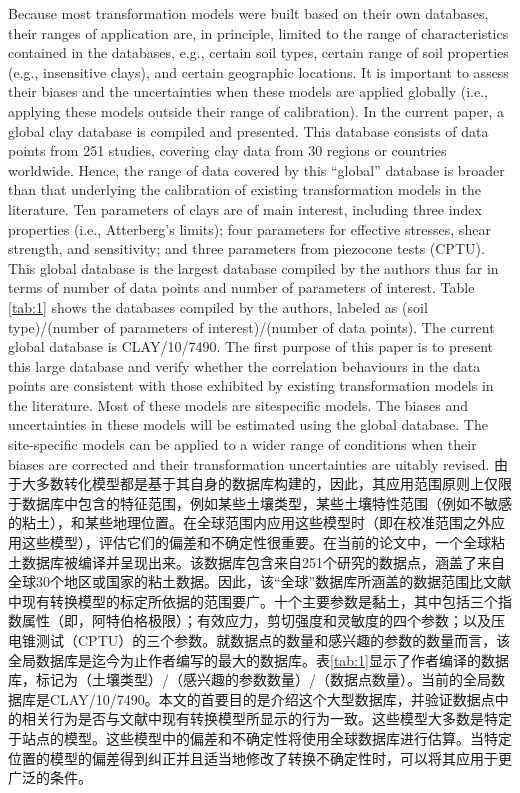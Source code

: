 \begin{Parallel}{0.60\textwidth}{}
{    }
    \ParallelPar
    \ParallelLText
    {
        Because most transformation models were built based on their own databases, their ranges of application are, in principle, limited to the range of characteristics contained in the databases, e.g., certain soil types, certain range of soil properties (e.g., insensitive clays), and certain geographic locations. It is important to assess their biases and the uncertainties when these models are applied globally (i.e., applying these models outside their range of calibration). In the current paper, a global clay database is compiled and presented. This database consists of data points from 251 studies, covering clay data from 30 regions or countries worldwide. Hence, the range of data covered by this “global” database is broader than that underlying the calibration of existing transformation models in the literature. Ten parameters of clays are of main interest, including three index properties (i.e., Atterberg’s limits); four parameters for effective stresses, shear strength, and sensitivity; and three parameters from piezocone tests (CPTU). This global database is the largest database compiled by the authors thus far in terms of number of data points and number of parameters of interest. Table \ref{tab:1} shows the databases compiled by the authors, labeled as (soil type)/(number of parameters of interest)/(number of data points). The current global database is CLAY/10/7490. The first purpose of this paper is to present this large database and verify whether the correlation behaviours in the data points are consistent with those exhibited by existing transformation models in the literature. Most of these models are sitespecific models. The biases and uncertainties in these models will be estimated using the global database. The site-specific models can be applied to a wider range of conditions when their biases are corrected and their transformation uncertainties are  uitably revised.
    }
    \ParallelRText
    {
        由于大多数转化模型都是基于其自身的数据库构建的，因此，其应用范围原则上仅限于数据库中包含的特征范围，例如某些土壤类型，某些土壤特性范围（例如不敏感的粘土），和某些地理位置。在全球范围内应用这些模型时（即在校准范围之外应用这些模型），评估它们的偏差和不确定性很重要。在当前的论文中，一个全球粘土数据库被编译并呈现出来。该数据库包含来自251个研究的数据点，涵盖了来自全球30个地区或国家的粘土数据。因此，该“全球”数据库所涵盖的数据范围比文献中现有转换模型的标定所依据的范围要广。十个主要参数是黏土，其中包括三个指数属性（即，阿特伯格极限）；有效应力，剪切强度和灵敏度的四个参数；以及压电锥测试（CPTU）的三个参数。就数据点的数量和感兴趣的参数的数量而言，该全局数据库是迄今为止作者编写的最大的数据库。表\ref{tab:1}显示了作者编译的数据库，标记为（土壤类型）/（感兴趣的参数数量）/（数据点数量）。当前的全局数据库是CLAY/10/7490。本文的首要目的是介绍这个大型数据库，并验证数据点中的相关行为是否与文献中现有转换模型所显示的行为一致。这些模型大多数是特定于站点的模型。这些模型中的偏差和不确定性将使用全球数据库进行估算。当特定位置的模型的偏差得到纠正并且适当地修改了转换不确定性时，可以将其应用于更广泛的条件。
}
\end{Parallel}

